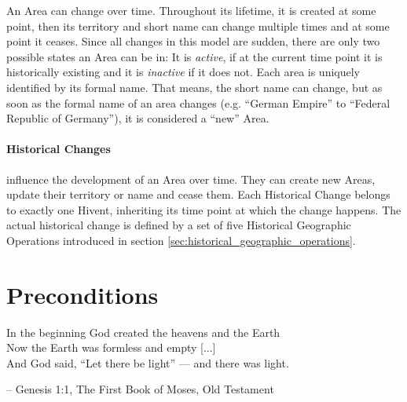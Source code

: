 An Area can change over time. Throughout its lifetime, it is created at some point, then its territory and short name can change multiple times and at some point it ceases. Since all changes in this model are sudden, there are only two possible states an Area can be in: It is \emph{active}, if at the current time point it is historically existing and it is \emph{inactive} if it does not. Each area is uniquely identified by its formal name. That means, the short name can change, but as soon as the formal name of an area changes (e.g. ``German Empire'' to ``Federal Republic of Germany''), it is considered a ``new'' Area.



\paragraph{Historical Changes} %
\label{par:historical_changes}

influence the development of an Area over time. They can create new Areas, update their territory or name and cease them. Each Historical Change belongs to exactly one Hivent, inheriting its time point at which the change happens.  The actual historical change is defined by a set of five Historical Geographic Operations introduced in section \ref{sec:historical_geographic_operations}.



\section{Preconditions} %
\label{sec:preconditions}

\begin{quoteit}
In the beginning God created the heavens and the Earth \\
Now the Earth was formless and empty [...] \\
And God said, “Let there be light” --- and there was light.
\end{quoteit}
\hfill -- Genesis 1:1, The First Book of Moses, Old Testament

